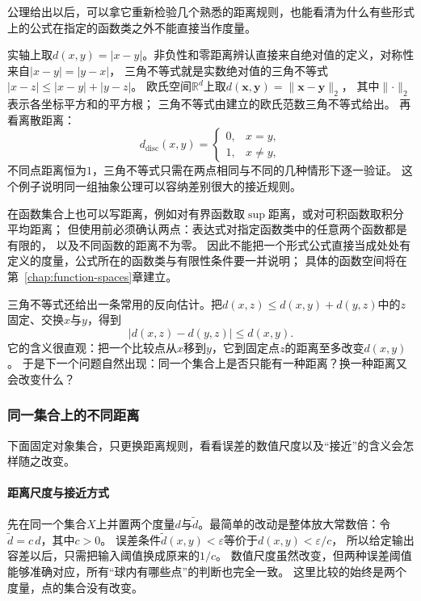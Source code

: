 公理给出以后，可以拿它重新检验几个熟悉的距离规则，也能看清为什么有些形式上的公式在指定的函数类之外不能直接当作度量。

实轴上取$d(x,y)=|x-y|$。非负性和零距离辨认直接来自绝对值的定义，对称性来自$|x-y|=|y-x|$，
三角不等式就是实数绝对值的三角不等式$|x-z|\leq|x-y|+|y-z|$。
欧氏空间$\mathbb R^d$上取$d(\bm{x},\bm{y})=\lVert\bm{x}-\bm{y}\rVert_2$，
其中$\lVert\cdot\rVert_2$表示各坐标平方和的平方根；
三角不等式由建立的欧氏范数三角不等式给出。
再看离散距离：
\[
  d_{\mathrm{disc}}(x,y)=
  \begin{cases}0,&x=y,\\1,&x\neq y,\end{cases}
\]
不同点距离恒为$1$，三角不等式只需在两点相同与不同的几种情形下逐一验证。
这个例子说明同一组抽象公理可以容纳差别很大的接近规则。

在函数集合上也可以写距离，例如对有界函数取$\sup$距离，或对可积函数取积分平均距离；
但使用前必须确认两点：表达式对指定函数类中的任意两个函数都是有限的，
以及不同函数的距离不为零。
因此不能把一个形式公式直接当成处处有定义的度量，公式所在的函数类与有限性条件要一并说明；
具体的函数空间将在第~\ref{chap:function-spaces}章建立。

三角不等式还给出一条常用的反向估计。把$d(x,z)\leq d(x,y)+d(y,z)$中的$z$固定、交换$x$与$y$，得到
\begin{equation}
\label{eq:metric-reverse-triangle}
  \bigl|d(x,z)-d(y,z)\bigr|\leq d(x,y).
\end{equation}
它的含义很直观：把一个比较点从$x$移到$y$，它到固定点$z$的距离至多改变$d(x,y)$。
于是下一个问题自然出现：同一个集合上是否只能有一种距离？换一种距离又会改变什么？

\subsubsection{同一集合上的不同距离}
\label{sec:metric-choice-of-metric}

下面固定对象集合，只更换距离规则，看看误差的数值尺度以及“接近”的含义会怎样随之改变。

\paragraph{距离尺度与接近方式}

先在同一个集合$X$上并置两个度量$d$与$\widetilde d$。最简单的改动是整体放大常数倍：令$\widetilde d=c\,d$，其中$c>0$。
误差条件$\widetilde d(x,y)<\varepsilon$等价于$d(x,y)<\varepsilon/c$，
所以给定输出容差以后，只需把输入阈值换成原来的$1/c$。
数值尺度虽然改变，但两种误差阈值能够准确对应，所有“球内有哪些点”的判断也完全一致。
这里比较的始终是两个度量，点的集合没有改变。

